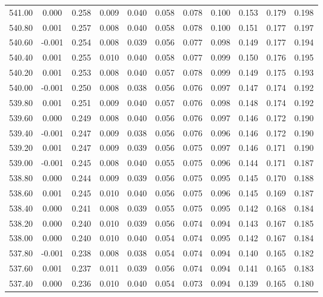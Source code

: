 \begin{longtable}{cccccccccc}
    541.00 &  0.000 &  0.258 &  0.009 &  0.040 &  0.058 &  0.078 &  0.100 &  0.153 &  0.179 &  0.198 \\
    540.80 &  0.001 &  0.257 &  0.008 &  0.040 &  0.058 &  0.078 &  0.100 &  0.151 &  0.177 &  0.197 \\
    540.60 & -0.001 &  0.254 &  0.008 &  0.039 &  0.056 &  0.077 &  0.098 &  0.149 &  0.177 &  0.194 \\
    540.40 &  0.001 &  0.255 &  0.010 &  0.040 &  0.058 &  0.077 &  0.099 &  0.150 &  0.176 &  0.195 \\
    540.20 &  0.001 &  0.253 &  0.008 &  0.040 &  0.057 &  0.078 &  0.099 &  0.149 &  0.175 &  0.193 \\
    540.00 & -0.001 &  0.250 &  0.008 &  0.038 &  0.056 &  0.076 &  0.097 &  0.147 &  0.174 &  0.192 \\
    539.80 &  0.001 &  0.251 &  0.009 &  0.040 &  0.057 &  0.076 &  0.098 &  0.148 &  0.174 &  0.192 \\
    539.60 &  0.000 &  0.249 &  0.008 &  0.040 &  0.056 &  0.076 &  0.097 &  0.146 &  0.172 &  0.190 \\
    539.40 & -0.001 &  0.247 &  0.009 &  0.038 &  0.056 &  0.076 &  0.096 &  0.146 &  0.172 &  0.190 \\
    539.20 &  0.001 &  0.247 &  0.009 &  0.039 &  0.056 &  0.075 &  0.097 &  0.146 &  0.171 &  0.190 \\
    539.00 & -0.001 &  0.245 &  0.008 &  0.040 &  0.055 &  0.075 &  0.096 &  0.144 &  0.171 &  0.187 \\
    538.80 &  0.000 &  0.244 &  0.009 &  0.039 &  0.056 &  0.075 &  0.095 &  0.145 &  0.170 &  0.188 \\
    538.60 &  0.001 &  0.245 &  0.010 &  0.040 &  0.056 &  0.075 &  0.096 &  0.145 &  0.169 &  0.187 \\
    538.40 &  0.000 &  0.241 &  0.008 &  0.039 &  0.055 &  0.075 &  0.095 &  0.142 &  0.168 &  0.184 \\
    538.20 &  0.000 &  0.240 &  0.010 &  0.039 &  0.056 &  0.074 &  0.094 &  0.143 &  0.167 &  0.185 \\
    538.00 &  0.000 &  0.240 &  0.010 &  0.040 &  0.054 &  0.074 &  0.095 &  0.142 &  0.167 &  0.184 \\
    537.80 & -0.001 &  0.238 &  0.008 &  0.038 &  0.054 &  0.074 &  0.094 &  0.140 &  0.165 &  0.182 \\
    537.60 &  0.001 &  0.237 &  0.011 &  0.039 &  0.056 &  0.074 &  0.094 &  0.141 &  0.165 &  0.183 \\
    537.40 &  0.000 &  0.236 &  0.010 &  0.040 &  0.054 &  0.073 &  0.094 &  0.139 &  0.165 &  0.180 \\

\end{longtable}
